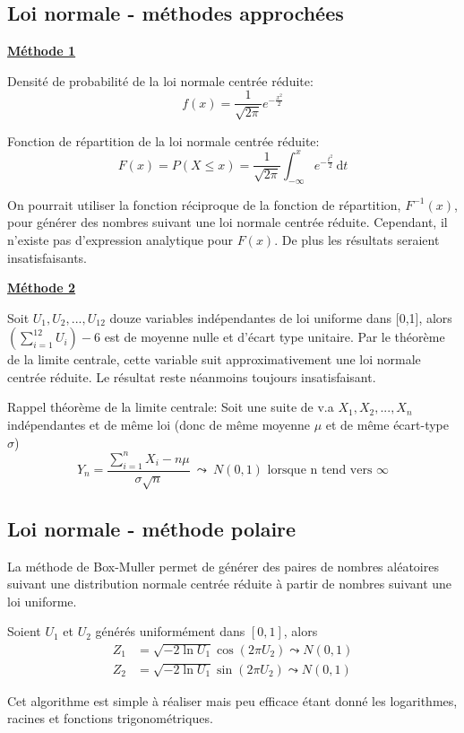 \subsection{Loi normale - méthodes approchées}
\textbf{\underline{Méthode 1}}

Densité de probabilité de la loi normale centrée réduite: $$f(x)=\frac{1}{\sqrt{2\pi}}e^{-\frac{x^2}{2}}$$

Fonction de répartition de la loi normale centrée réduite: $$F(x)=P(X \leq x)=\frac{1}{\sqrt{2\pi}} \int_{-\infty}^{x} e^{-\frac{t^2}{2}} \, \mathrm dt$$

On pourrait utiliser la fonction réciproque de la fonction de répartition, $F^{-1}(x)$, pour générer des nombres suivant une loi normale centrée réduite. Cependant,
il n'existe pas d'expression analytique pour $F(x)$. De plus les résultats seraient insatisfaisants.
\vspace{0.3cm}

\textbf{\underline{Méthode 2}}

Soit $U_{1}, U_{2},...,U_{12}$ douze variables indépendantes de loi uniforme dans [0,1], alors $(\sum\limits_{i=1}^{12} U_{i})-6$ est de moyenne nulle et d'écart type unitaire.
Par le théorème de la limite centrale, cette variable suit approximativement une loi normale centrée réduite. Le résultat reste néanmoins toujours insatisfaisant.

Rappel théorème de la limite centrale: Soit une suite de v.a $X_1, X_2,..., X_n$ indépendantes et de même loi (donc de même moyenne $\mu$ et de même écart-type $\sigma$)
\[ Y_{n}=\frac{\sum\limits_{i=1}^{n} X_i -n\mu}{\sigma \sqrt{n}}\ \leadsto \ N(0,1)\text{ lorsque n tend vers }\infty \]
 
\subsection{Loi normale - méthode polaire}
La méthode de Box-Muller permet de générer des paires de nombres aléatoires suivant une distribution normale centrée réduite à partir
de nombres suivant une loi uniforme.

Soient $U_1$ et $U_2$ générés uniformément dans $[0, 1]$, alors
\[
		\begin{split}
		Z_1&=\sqrt{-2 \ln{U_1}}\cos(2\pi U_2) \leadsto N(0,1)\\
		Z_2&=\sqrt{-2 \ln{U_1}}\sin(2\pi U_2) \leadsto N(0,1)
		\end{split}
\]

Cet algorithme est simple à réaliser mais peu efficace étant donné les logarithmes, racines et fonctions trigonométriques.
\newpage

